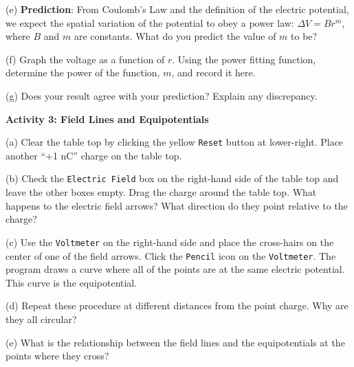 


(e) \textbf{Prediction}: From Coulomb's Law and the definition of the
electric potential, we expect the spatial variation of the potential
to obey a power law: \( \Delta V=Br^{m} \), where \( B \) and \( m \)
are constants. What do you predict the value of \( m \) to be?
\vspace{12mm}

\newpage

(f) Graph the voltage as a function of $r$. Using the power fitting
function, determine the power of the function, $m$, and record it here.
\vspace{12mm}

(g) Does your result agree with your prediction? Explain any discrepancy.
\vspace{12mm}

\textbf{Activity 3: Field Lines and Equipotentials}

(a) Clear the table top by clicking the yellow {\tt Reset} button at lower-right.
Place another ``+1 nC'' charge on the table top.

(b) Check the {\tt Electric Field} box on the right-hand side of the table top
and leave the other boxes empty.
Drag the charge around the table top.
What happens to the electric field arrows?
What direction do they point relative to the charge?
\vspace{30mm}

(c) Use the {\tt Voltmeter} on the right-hand side and place the cross-hairs
on the center of one of the field arrows. 
Click the {\tt Pencil} icon on the {\tt Voltmeter}.
The program draws a curve where all of the points are at the same electric potential.
This curve is the equipotential.

(d) Repeat these procedure at different distances from the point charge.
Why are they all circular?
\vspace{30mm}

(e) What is the relationship between the field lines and the equipotentials at 
the points where they cross?
